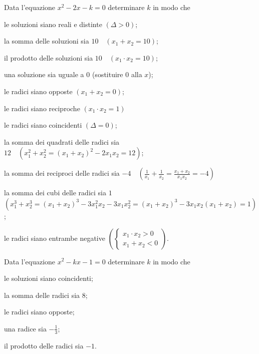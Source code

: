 \begin{esercizio}[\Ast]
 \label{ese:3.97}
Data l'equazione $x^{2}-2 x-k = 0$ determinare $k$ in modo che
\begin{enumeratea}
\item le soluzioni siano reali e distinte \quad $(\Delta>0)$;
\item la somma delle soluzioni sia $10 \quad (x_{1} + x_{2} = 10)$;
\item il prodotto delle soluzioni sia $10 \quad (x_{1} \cdot x_{2} = 10)$;
\item una soluzione sia uguale a $0$ \quad (sostituire $0$ alla $x$);
\item le radici siano opposte \quad $(x_{1} + x_{2} = 0)$;
\item le radici siano reciproche \quad $(x_{1} \cdot x_{2} = 1)$
\item le radici siano coincidenti \quad $(\Delta=0)$;
\item la somma dei quadrati delle radici sia $12 \quad \left(x_{1}^{2} + x_{2}^{2} = (x_{1} + x_{2})^{2}-2x_{1} x_{2} = 12\right)$;
\item la somma dei reciproci delle radici sia $-4 \quad \left(\frac{1}{x_{1}} + \frac{1}{x_{2}} = \frac{x_{1} +x_{2}}{x_{1} x_{2}} =-4 \right)$
\item la somma dei cubi delle radici sia $1$ \protect\\ $\left( x_{1}^{3} + x_{2}^{3} = (x_{1} + x_{2})^{3}-3x_{1}^{2} x_{2}-3x_{1} x_{2}^{2} = (x_{1} + x_{2})^{3}-3x_{1} x_{2} (x_{1} + x_{2}) = 1\right)$;
\item le radici siano entrambe negative $\left(\left\{\begin{array}{l} x_{1} \cdot x_{2} > 0 \\x_{1} + x_{2} < 0 \end{array}\right.\right)$.
\end{enumeratea}
\end{esercizio}

\begin{esercizio}[\Ast]
 \label{ese:3.98}
Data l'equazione $x^{2}-k x-1 = 0$ determinare $k$ in modo che
\begin{enumeratea}
\item le soluzioni siano coincidenti;
\item la somma delle radici sia $8$;
\item le radici siano opposte;
\item una radice sia $- \frac{1}{3}$;
\item il prodotto delle radici sia $-1$.
\end{enumeratea}
\end{esercizio}

